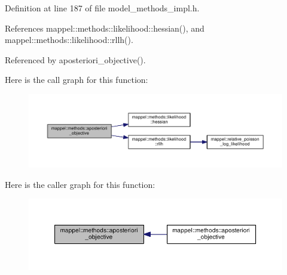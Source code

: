 Definition at line 187 of file model\+\_\+methods\+\_\+impl.\+h.



References mappel\+::methods\+::likelihood\+::hessian(), and mappel\+::methods\+::likelihood\+::rllh().



Referenced by aposteriori\+\_\+objective().



Here is the call graph for this function\+:\nopagebreak
\begin{figure}[H]
\begin{center}
\leavevmode
\includegraphics[width=350pt]{namespacemappel_1_1methods_a5227b7c0f1c45c27cbebfcafefcab72b_cgraph}
\end{center}
\end{figure}




Here is the caller graph for this function\+:\nopagebreak
\begin{figure}[H]
\begin{center}
\leavevmode
\includegraphics[width=350pt]{namespacemappel_1_1methods_a5227b7c0f1c45c27cbebfcafefcab72b_icgraph}
\end{center}
\end{figure}


